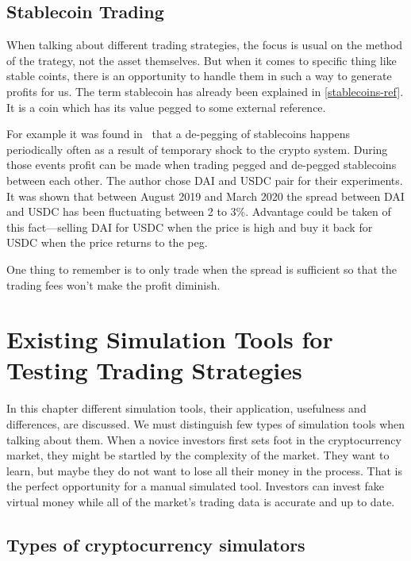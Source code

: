 \section{Stablecoin Trading}

When talking about different trading strategies, the focus is usual on the method of the trategy, not the asset themselves. But when it comes to specific thing like stable coints, there is an opportunity to handle them in such a way to generate profits for us.
The term stablecoin has already been explained in \ref{stablecoins-ref}. It is a coin which has its value pegged to some external reference.

For example it was found in~\cite{make-money-stablecoins} that a de-pegging of stablecoins happens periodically often as a result of temporary shock to the crypto system. During those events profit can be made when trading pegged and de-pegged stablecoins between each other. The author chose DAI and USDC pair for their experiments. It was shown that between August 2019 and March 2020 the spread between DAI and USDC has been fluctuating between 2 to 3\%. Advantage could be taken of this fact---selling DAI for USDC when the price is high and buy it back for USDC when the price returns to the peg.

One thing to remember is to only trade when the spread is sufficient so that the trading fees won't make the profit diminish.

\chapter{Existing Simulation Tools for Testing Trading Strategies}
\label{chapter-simulation-tools}

In this chapter different simulation tools, their application, usefulness and differences, are discussed. We must distinguish few types of simulation tools when talking about them. When a novice investors first sets foot in the cryptocurrency market, they might be startled by the complexity of the market. They want to learn, but maybe they do not want to lose all their money in the process. That is the perfect opportunity for a manual simulated tool. Investors can invest fake virtual money while all of the market's trading data is accurate and up to date.

\section*{Types of cryptocurrency simulators}

